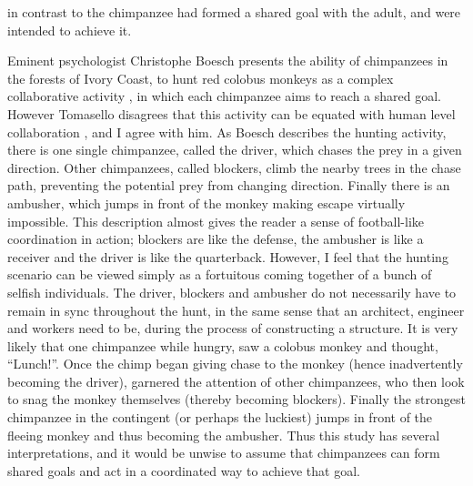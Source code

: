 \documentclass[12pt, letter]{article}
\begin{document}
in contrast to the chimpanzee had formed a shared goal with the adult, and were 	intended to achieve it.

Eminent psychologist Christophe Boesch presents the ability of chimpanzees in the forests of Ivory Coast, to hunt red colobus monkeys as a complex collaborative activity \cite{boesch2005joint}, in which each chimpanzee aims to reach a shared goal. However Tomasello disagrees that this activity can be equated with human level collaboration \cite{tomasello2005understanding}, and I agree with him. As Boesch describes the hunting activity, there is one single chimpanzee, called the driver, which chases the prey in a given direction. Other chimpanzees, called blockers, climb the nearby trees in the chase path, preventing the potential prey from changing direction. Finally there is an ambusher, which jumps in front of the monkey making escape virtually impossible. This description almost gives the reader a sense of football-like coordination in action; blockers are like the defense, the ambusher is like a receiver and the driver is like the quarterback. However, I feel that the hunting scenario can be viewed simply as a fortuitous coming together of a bunch of selfish individuals. The driver, blockers and ambusher do not necessarily have to remain in sync throughout the hunt, in the same sense that an architect, engineer and workers need to be, during the process of constructing a structure. It is very likely that one chimpanzee while hungry, saw a colobus monkey and thought, ``Lunch!''. Once the chimp began giving chase to the monkey (hence inadvertently becoming the driver), garnered the attention of other chimpanzees, who then look to snag the monkey themselves (thereby becoming blockers). Finally the strongest chimpanzee in the contingent (or perhaps the luckiest) jumps in front of the fleeing monkey and thus becoming the ambusher. Thus this study has several interpretations, and it would be unwise to assume that chimpanzees can form shared goals and act in a coordinated way to achieve that goal.
\end{document}
